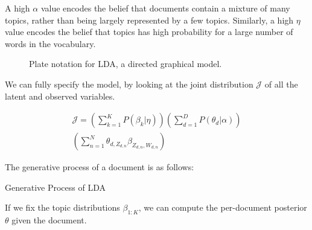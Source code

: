 \documentclass[letterpaper]{article}
\begin{document}
A high $\alpha$ value encodes the belief that documents contain a
mixture of many topics, rather than being largely represented by a few
topics. Similarly, a high $\eta$ value encodes the belief that topics
has high probability for a large number of words in the vocabulary.

\begin{figure}[ht]
  \centering
  \caption{\label{fig:lda_plate} Plate notation for LDA, a directed
    graphical model.}
\end{figure}

We can fully specify the model, by looking at the joint distribution
$\mathcal{J}$ of all the latent and observed variables.

\begin{multline}
 \mathcal{J} = \left( \sum_{k=1}^{K} P(\beta_k | \eta) \right) \left(
    \sum_{d=1}^{D} P(\theta_d | \alpha) \right) \\
  \left( \sum_{n=1}^{N} \theta_{d, Z_{d,n}} \beta_{Z_{d,n}, W_{d,n}} \right)  
\end{multline}

The generative process of a document is as follows:

\begin{algorithm}
  \caption{Generative Process of LDA}\label{alg:DTM}
  \begin{algorithmic}[1]
    \EndFor
    \EndFor
  \end{algorithmic}
\end{algorithm}

If we fix the topic distributions $\beta_{1:K}$, we can compute the
per-document posterior $\theta$ given the document.
\end{document}
